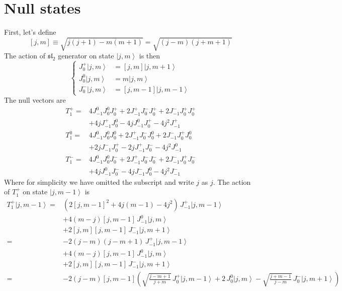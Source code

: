 \documentclass[10pt,a4paper]{article}
\numberwithin{equation}{section}
\newcommand{\ket}[1]{\left| #1 \right\rangle}
\begin{document}
\section{Null states}
First, let's define 
\begin{equation}
    \boxed{
        [j,m] \equiv \sqrt{j(j+1)-m(m+1)} = \sqrt{(j-m)(j+m+1)}
    }
\end{equation}
The action of $\mathfrak{sl}_{2}$ generator on state $\ket{j,m}$ is then 
\begin{equation}
    \left\{
        \begin{aligned}
            J^{+}_{0} \ket{j,m} & = [j,m] \ket{j,m+1}\\
            J^{0}_{0} \ket{j,m} & = m \ket{j,m}\\
            J^{-}_{0} \ket{j,m} & = [j,m-1] \ket{j,m-1}
        \end{aligned}
    \right.
\end{equation}
The null vectors are 
\begin{equation}
    \begin{aligned}
        T^{+}_{1} = & 4 J^{0}_{-1} J^{0}_{0} J^{+}_{0} + 2 J^{+}_{-1} J^{-}_{0} J^{+}_{0} + 2 J^{-}_{-1} J^{+}_{0} J^{+}_{0} \\
        & +4j J^{+}_{-1} J^{0}_{0} -4j J^{0}_{-1} J^{+}_{0} - 4 j^2 J^{+}_{-1}\\
        T^{0}_{1} = & 4 J^{0}_{-1} J^{0}_{0} J^{0}_{0} + 2 J^{+}_{-1} J^{-}_{0} J^{0}_{0} + 2 J^{-}_{-1} J^{+}_{0} J^{0}_{0} \\
        & +2j J^{-}_{-1} J^{+}_{0} -2j J^{+}_{-1} J^{-}_{0} - 4 j^2 J^{0}_{-1}\\
        T^{-}_{1} = & 4 J^{0}_{-1} J^{0}_{0} J^{-}_{0} + 2 J^{+}_{-1} J^{-}_{0} J^{-}_{0} + 2 J^{-}_{-1} J^{+}_{0} J^{-}_{0} \\
        & +4j J^{0}_{-1} J^{-}_{0} -4j J^{-}_{-1} J^{0}_{0} - 4 j^2 J^{-}_{-1}
    \end{aligned}
\end{equation}
Where for simplicity we have omitted the subscript and write $j$ as $j$. The action of $T^{+}_{1}$ on state $\ket{j,m-1}$ is 
\begin{equation}
    \begin{aligned}
        T^{+}_{1} \ket{j,m-1} = & (2[j,m-1]^{2} + 4 j (m-1) - 4 j^{2}) \, J^{+}_{-1}  \ket{j,m-1} \\
        & + 4(m-j) [j,m-1] \, J^{0}_{-1}  \ket{j,m} \\
        & + 2 [j,m] [j,m-1] \, J^{-}_{-1} \ket{j,m+1}\\
        = &  -2(j-m)(j-m+1) \, J^{+}_{-1} \ket{j,m-1} \\
        & + 4(m-j) [j,m-1] \, J^{0}_{-1} \ket{j,m} \\
        & + 2 [j,m] [j,m-1] \, J^{-}_{-1} \ket{j,m+1}\\
        = & -2(j-m) [j,m-1] \left( \sqrt{\frac{j-m+1}{j+m}} \, J^{+}_{0} \ket{j,m-1} + 2 \, J^{0}_{0} \ket{j,m} - \sqrt{\frac{j+m-1}{j-m}} \, J^{-}_{0} \ket{j,m+1}  \right)
    \end{aligned}
\end{equation}
\end{document}
